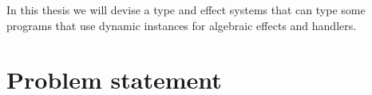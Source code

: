 In this thesis we will devise a type and effect systems that can type some programs that use dynamic instances for algebraic effects and handlers.

\section{Problem statement}







